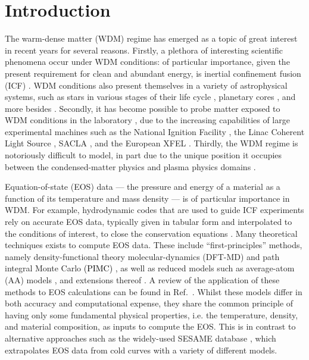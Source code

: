 \documentclass[%
 preprint,
 superscriptaddress,
 amsmath,amssymb,
longbibliography,
]{revtex4-2}
\newcommand{\change}[1]{\textcolor{black}{#1}}
\begin{document}
\tableofcontents

\section{Introduction}


The warm-dense matter (WDM) regime has emerged as a topic of great interest in recent years \cite{Koenig_2005,DOE09,BMPC14,falk_2018,Bonitz_WDM_review,Dornheim_WDM_review} for several reasons. Firstly, a plethora of interesting scientific phenomena occur under WDM conditions: of particular importance, given the present requirement for clean and abundant energy, is inertial confinement fusion (ICF) \cite{Kritcher_ICF_11,Lindl_ICF_04,Betti2016ICF,Craxton2015ICF}. WDM conditions also present themselves in a variety of astrophysical systems, such as stars in various stages of their life cycle \cite{brown_dwarfs,white_dwarfs,neutron_stars}, planetary cores \cite{planetary_cores_1,earth_core_iron}, and more besides \cite{Remington_HED}. Secondly, it has become possible to probe matter exposed to WDM conditions in the laboratory \cite{falk_2018,Expt_EOS_database,Redmer_XRTS,Vinko_nickel_2020,Aluminium_IPD_expt_2012,Kraus_WDM_Carbon}, due to the increasing capabilities of large experimental machines such as the National Ignition Facility \cite{NIF}, the Linac Coherent Light Source \cite{LINAC}, SACLA \cite{SACLA}, and the European XFEL \cite{XFEL}. Thirdly, the WDM regime is notoriously difficult to model, in part due to the unique position it occupies between the condensed-matter physics and plasma physics domains \cite{Dornheim_WDM_review, Bonitz_WDM_review, Callow_AA_22}.

Equation-of-state (EOS) data --- the pressure and energy of a material as a function of its temperature and mass density --- is of particular importance in WDM. For example, hydrodynamic codes that are used to guide ICF experiments rely on accurate EOS data, typically given in tabular form and interpolated to the conditions of interest, to close the conservation equations \cite{EOS_review}. Many theoretical techniques exists to compute EOS data. These include ``first-principles'' methods, namely density-functional theory molecular-dynamics (DFT-MD) \cite{Militzer_EOS_database, Hu_Be_EOS} and path integral Monte Carlo \change{(PIMC)} \cite{Militzer_EOS_database,Deuterium_PIMC}, as well as reduced models such as average-atom (AA) models \cite{Liberman_1979,starrett_aa_pressure,Pressure_warm_hot}, and extensions thereof \cite{Starrett_PMD,VAAQP}. A review of the application of these methods to EOS calculations can be found in Ref.~\cite{EOS_review}. Whilst these models differ in both accuracy and computational expense, they share the common principle of having only some fundamental physical properties, i.e. the temperature, density, and material composition, as inputs to compute the EOS. This is in contrast to alternative approaches such as the widely-used SESAME database \cite{SESAME_database}, which extrapolates EOS data from cold curves with a variety of different models.
\end{document}
